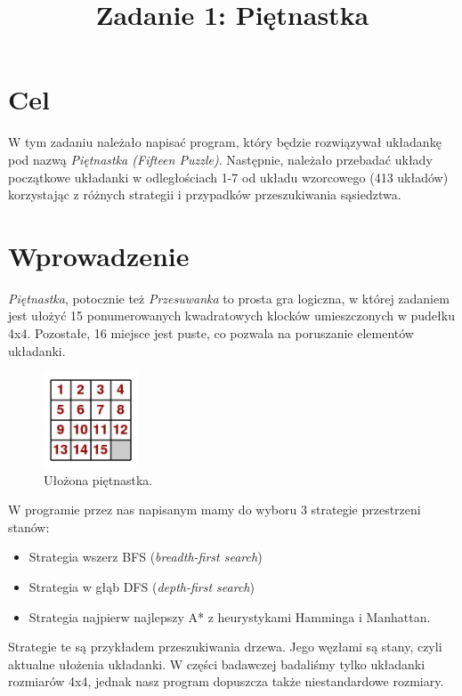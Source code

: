 \documentclass{classrep}
\author{
  \studentinfo{Radosław Grela}{216769} \and
  \studentinfo{Jakub Wąchała}{216914}
}
\title{Zadanie 1: Piętnastka}
\begin{document}
\maketitle

\newpage

\section{Cel} %
W tym zadaniu należało napisać program, który będzie rozwiązywał układankę pod nazwą \textsl{Piętnastka (Fifteen Puzzle)}.
Następnie, należało przebadać układy początkowe układanki w odległościach 1-7 od układu wzorcowego (413 układów)
korzystając z różnych strategii i przypadków przeszukiwania sąsiedztwa.

\section{Wprowadzenie} %
\textsl{Piętnastka}, potocznie też \textsl{Przesuwanka} to prosta gra logiczna, w której zadaniem jest ułożyć 15 ponumerowanych kwadratowych klocków umieszczonych w pudełku 4x4. Pozostałe, 16 miejsce jest puste, co pozwala na poruszanie elementów układanki.\cite{pierwszymath} 
\begin{figure}[h!]
    \centering
    \includegraphics[width=0.25\textwidth]{15grid1.jpg}
    \caption{Ułożona piętnastka. \cite{pierwszymath}}
\end{figure}

W programie przez nas napisanym mamy do wyboru 3 strategie przestrzeni stanów:
\begin{itemize}
\item Strategia wszerz BFS (\textsl{breadth-first search})
\item Strategia w głąb DFS (\textsl{depth-first search})
\item Strategia najpierw najlepszy A* z heurystykami Hamminga i Manhattan.
\end{itemize}
Strategie te są przykładem przeszukiwania drzewa. Jego węzłami są stany, czyli aktualne ułożenia układanki.
W części badawczej badaliśmy tylko układanki rozmiarów 4x4, jednak nasz program dopuszcza także niestandardowe rozmiary.
\end{document}
